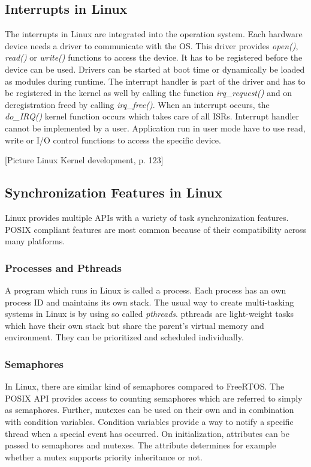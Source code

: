 \subsection{Interrupts in Linux}\label{ss_interrupts_in_linux}
The interrupts in Linux are integrated into the operation system.
Each hardware device needs a driver to communicate with the \ac{OS}.
This driver provides \textit{open()}, \textit{read()} or \textit{write()} functions to access the device. 
It has to be registered before the device can be used.
Drivers can be started at boot time or dynamically be loaded as modules during runtime.
The interrupt handler is part of the driver and has to be registered in the kernel as well by calling the function \textit{irq\_request()} and on deregistration freed by calling \textit{irq\_free()}.
When an interrupt occurs, the \textit{do\_IRQ()} kernel function occurs which takes care of all \acp{ISR}. 
Interrupt handler cannot be implemented by a user.
Application run in user mode have to use read, write or \ac{I/O} control functions to access the specific device.

[Picture Linux Kernel development, p. 123]

\subsection{Synchronization Features in Linux}
Linux provides multiple \acp{API} with a variety of task synchronization features. 
\ac{POSIX} compliant features are most common because of their compatibility across many platforms.
\subsubsection{Processes and Pthreads}
A program which runs in Linux is called a process. 
Each process has an own process ID and maintains its own stack. 
The usual way to create multi-tasking systems in Linux is by using so called \textit{pthreads}.
pthreads are light-weight tasks which have their own stack but share the parent's virtual memory and environment.
They can be prioritized and scheduled individually. 
\subsubsection{Semaphores}
In Linux, there are similar kind of semaphores compared to FreeRTOS.
The \ac{POSIX} \ac{API} provides access to counting semaphores which are referred to simply as semaphores.
Further, mutexes can be used on their own and in combination with condition variables.
Condition variables provide a way to notify a specific thread when a special event has occurred. 
On initialization, attributes can be passed to semaphores and mutexes.
The attribute determines for example whether a mutex supports priority inheritance or not.
